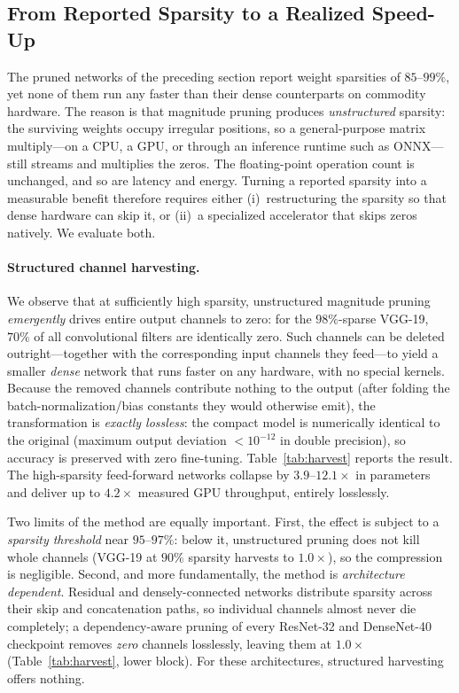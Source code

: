 
\subsection{From Reported Sparsity to a Realized Speed-Up}
\label{subsec:sparse-harvest}

The pruned networks of the preceding section report weight sparsities of
$85$--$99\%$, yet none of them run any faster than their dense counterparts on
commodity hardware. The reason is that magnitude pruning produces
\emph{unstructured} sparsity: the surviving weights occupy irregular positions,
so a general-purpose matrix multiply---on a CPU, a GPU, or through an inference
runtime such as ONNX---still streams and multiplies the zeros. The floating-point
operation count is unchanged, and so are latency and energy. Turning a reported
sparsity into a measurable benefit therefore requires either (i)~restructuring the
sparsity so that dense hardware can skip it, or (ii)~a specialized accelerator that
skips zeros natively. We evaluate both.

\paragraph{Structured channel harvesting.}
We observe that at sufficiently high sparsity, unstructured magnitude pruning
\emph{emergently} drives entire output channels to zero: for the $98\%$-sparse
VGG-19, $70\%$ of all convolutional filters are identically zero. Such channels can
be deleted outright---together with the corresponding input channels they feed---to
yield a smaller \emph{dense} network that runs faster on any hardware, with no
special kernels. Because the removed channels contribute nothing to the output
(after folding the batch-normalization/bias constants they would otherwise emit),
the transformation is \emph{exactly lossless}: the compact model is numerically
identical to the original (maximum output deviation $<10^{-12}$ in double
precision), so accuracy is preserved with zero fine-tuning. Table~\ref{tab:harvest}
reports the result. The high-sparsity feed-forward networks collapse by
$3.9$--$12.1\times$ in parameters and deliver up to $4.2\times$ measured GPU
throughput, entirely losslessly.

Two limits of the method are equally important. First, the effect is subject to a
\emph{sparsity threshold} near $95$--$97\%$: below it, unstructured pruning does not
kill whole channels (VGG-19 at $90\%$ sparsity harvests to $1.0\times$), so the
compression is negligible. Second, and more fundamentally, the method is
\emph{architecture dependent}. Residual and densely-connected networks distribute
sparsity across their skip and concatenation paths, so individual channels almost
never die completely; a dependency-aware pruning of every ResNet-32 and DenseNet-40
checkpoint removes \emph{zero} channels losslessly, leaving them at $1.0\times$
(Table~\ref{tab:harvest}, lower block). For these architectures, structured
harvesting offers nothing.

